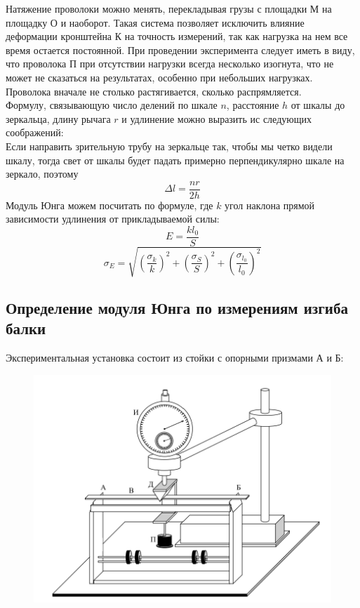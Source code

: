 \documentclass[a4paper,12pt]{article} %
\begin{document}
Натяжение проволоки можно менять, перекладывая грузы с площадки М на площадку О и наоборот. Такая система позволяет исключить влияние деформации кронштейна К на точность измерений, так как нагрузка на нем все время остается постоянной.
При проведении эксперимента следует иметь в виду, что проволока П при отсутствии нагрузки всегда несколько изогнута, что не может не сказаться на результатах, особенно при небольших нагрузках. Проволока вначале не столько растягивается, сколько распрямляется.\\
Формулу, связывающую число делений по шкале $n$, расстояние $h$ от шкалы до зеркальца, длину рычага $r$ и удлинение можно выразить ис следующих соображений:\\
Если направить зрительную трубу на зеркальце так, чтобы мы четко видели шкалу, тогда свет от шкалы будет падать примерно перпендикулярно шкале на зеркало, поэтому
\[
    \Delta l =\dfrac{nr}{2h}
\]
Модуль Юнга можем посчитать по формуле, где $k$ угол наклона прямой зависимости удлинения от прикладываемой силы:
\[
    E = \frac{kl_0}{S}
\]
\begin{equation}
    \sigma_E = \sqrt{\left( \dfrac{\sigma_{k}}{k} \right)^2 + \left( \dfrac{\sigma_{S}}{S} \right)^2 + \left( \dfrac{\sigma_{l_0}}{l_0} \right)^2 }
\end{equation}

\subsection{Определение модуля Юнга по измерениям изгиба балки}

Экспериментальная установка состоит из стойки с опорными призмами А и Б:

\begin{figure}[H]
    \centering
    \includegraphics[height=0.4\textheight]{images/2.png}
\end{figure}
\end{document}
